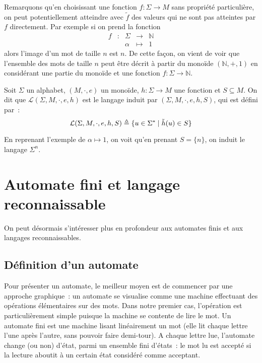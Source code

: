 Remarquons qu'en choisissant une fonction $f : \Sigma \to M$ sans propriété
particulière, on peut potentiellement atteindre avec $\tilde f$ des valeurs qui
ne sont pas atteintes par $f$ directement. Par exemple si on prend la fonction
\[\begin{array}{ccccc}
f & : & \Sigma & \longrightarrow & \mathbb N\\
& & \alpha & \longmapsto & 1
\end{array}\]
alors l'image d'un mot de taille $n$ est $n$. De cette façon, on vient de voir
que l'ensemble des mots de taille $n$ peut être décrit à partir du monoïde
$(\mathbb N,+,1)$ en considérant une partie du monoïde et une fonction
$f : \Sigma \to \mathbb N$.

\begin{definition}
  Soit $\Sigma$ un alphabet, $(M,\cdot,e)$ un monoïde, $h : \Sigma \to M$ une
  fonction et $S\subseteq M$. On dit que $\mathcal L(\Sigma,M,\cdot,e,h)$ est
  le langage induit par $(\Sigma,M,\cdot,e,h,S)$, qui est défini par~:
  \[\mathcal L(\Sigma,M,\cdot,e,h,S)\triangleq
  \{u\in\Sigma^*\mid \tilde h(u)\in S\}\]
\end{definition}

En reprenant l'exemple de $\alpha \mapsto 1$, on voit qu'en prenant $S = \{n\}$,
on induit le langage $\Sigma^n$.

\section{Automate fini et langage reconnaissable}

On peut désormais s'intéresser plus en profondeur aux automates finis et aux
langages reconnaissables.

\subsection{Définition d'un automate}

Pour présenter un automate, le meilleur moyen est de commencer par une approche
graphique~: un automate se visualise comme une machine effectuant des opérations
élémentaires sur des mots. Dans notre premier cas, l'opération est
particulièrement simple puisque la machine se contente de lire le mot. Un
automate fini est une machine lisant linéairement un mot (elle lit chaque lettre
l'une après l'autre, sans pouvoir faire demi-tour). A chaque lettre lue,
l'automate change (ou non) d'état, parmi un ensemble fini d'états~: le mot lu
est accepté si la lecture aboutit à un certain état considéré comme acceptant.

